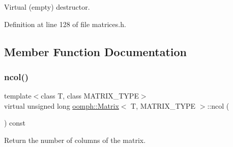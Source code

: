 Virtual (empty) destructor. 



Definition at line 128 of file matrices.\+h.



\subsection{Member Function Documentation}
\mbox{\label{classoomph_1_1Matrix_ad1af46b34096c348272b0dfacb5ce6a9}} 
\subsubsection{\texorpdfstring{ncol()}{ncol()}}
{\footnotesize\ttfamily template$<$class T, class M\+A\+T\+R\+I\+X\+\_\+\+T\+Y\+PE$>$ \\
virtual unsigned long \hyperlink{classoomph_1_1Matrix}{oomph\+::\+Matrix}$<$ T, M\+A\+T\+R\+I\+X\+\_\+\+T\+Y\+PE $>$\+::ncol (\begin{DoxyParamCaption}{ }\end{DoxyParamCaption}) const\hspace{0.3cm}{\ttfamily [pure virtual]}}



Return the number of columns of the matrix. 



